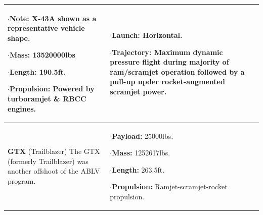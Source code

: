 {\begin{landscape}
\begin{xltabular}{\linewidth}{|X|X|X|}
$\cdot$\textbf{Note:} X-43A shown as a representative vehicle shape.

$\cdot$\textbf{Mass:} 13520000lbs

$\cdot$\textbf{Length:} 190.5ft.

$\cdot$\textbf{Propulsion:} Powered by turboramjet \& RBCC engines.

&
\small
{}

$\cdot$\textbf{Launch:} Horizontal. 

$\cdot$\textbf{Trajectory:} Maximum dynamic pressure flight during majority of ram/scramjet operation followed by a pull-up upder rocket-augmented scramjet power. 
\\ 
\hline\small \textbf{GTX} (Trailblazer)\cite{Roche2000,Trefny1999} 
\newline \newline 
The GTX (formerly Trailblazer) was another offshoot of the ABLV program.
&
\small {} 

$\cdot$\textbf{Payload:} 25000lbs.

$\cdot$\textbf{Mass:} 1252617lbs.

$\cdot$\textbf{Length:} 263.5ft.


$\cdot$\textbf{Propulsion:} Ramjet-scramjet-rocket propulsion. 
 
&
\small {}


\end{xltabular}
\end{landscape}}

